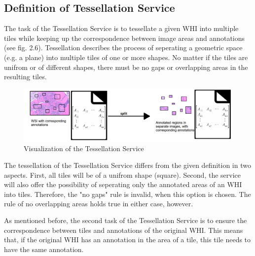 \subsection{Definition of Tessellation Service}

The task of the Tessellation Service is to tessellate a given WHI into multiple tiles while keeping up the correspondence between image areas and annotations (see fig. 2.6). Tessellation describes the process of seperating a geometric space (e.g. a plane) into multiple tiles of one or more shapes. No matter if the tiles are unifrom or of different shapes, there must be no gaps or overlapping areas in the resulting tiles.

\begin{figure}[H]
	\begin{center}
		\includegraphics[scale=0.3]{img/processChainC.png}
		\caption{Visualization of the Tessellation Service}
		\label{fig:fig2.6}
	\end{center}
\end{figure}

The tessellation of the Tessellation Service differs from the given definition in two aspects. First, all tiles will be of a unifrom shape (square). Second, the service will also offer the possibility of seperating only the annotated areas of an WHI into tiles. Therefore, the "no gaps" rule is invalid, when this option is chosen. The rule of no overlapping areas holds true in either case, however.

As mentioned before, the second task of the Tessellation Service is to ensure the correspondence between tiles and annotations of the original WHI. This means that, if the original WHI has an annotation in the area of a tile, this tile needs to have the same annotation.